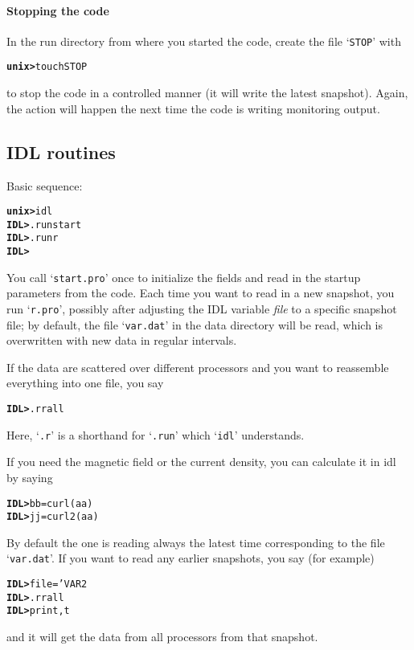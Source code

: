 \documentclass[12pt,twoside,notitlepage,a4paper]{article}
\makeatletter
\newcommand{\prompt}[1]{{\ttfamily\bfseries{}#1}}
\newcommand{\var}[1]{\textsl{#1}\index{#1@\emph{#1}}\/}
\newcommand{\file}[1]{`\texttt{#1}'}
\makeatother
\begin{document}
\paragraph{Stopping the code}
In the run directory from where you started the code, create the file
\file{STOP} with
\begin{alltt}
  \prompt{unix> } touch STOP \
\end{alltt}
to stop the code in a controlled manner (it will write the latest
snapshot).
Again, the action will happen the next time the code is writing monitoring
output.


\subsection{IDL routines}
\label{S_IDLroutines}

Basic sequence:
\begin{alltt}
  \prompt{unix> } idl
  \prompt{IDL> }  .run start
  \prompt{IDL> }  .run r
  \prompt{IDL> }  {} \
\end{alltt}
You call \file{start.pro} once to initialize the fields and read in the
startup parameters from the code.
Each time you want to read in a new snapshot, you run \file{r.pro},
possibly after adjusting the IDL variable \var{file} to a specific snapshot
file; by default, the file \file{var.dat} in the data directory will be
read, which is overwritten with new data in regular intervals.

If the data are scattered over different processors and you want to
reassemble everything into one file, you say
\begin{alltt}
  \prompt{IDL> }  .r rall
\end{alltt}
Here, \file{.r} is a shorthand for \file{.run} which \file{idl} understands.

If you need the magnetic field or the current density, you can calculate
it in idl by saying
\begin{alltt}
  \prompt{IDL> }  bb=curl(aa)
  \prompt{IDL> }  jj=curl2(aa)
\end{alltt}

By default the one is reading always the latest time corresponding to the file
\file{var.dat}. If you want to read any earlier snapshots, you say (for example)
\begin{alltt}
  \prompt{IDL> }  file='VAR2
  \prompt{IDL> }  .r rall
  \prompt{IDL> }  print,t
\end{alltt}
and it will get the data from all processors from that snapshot.
\end{document}
